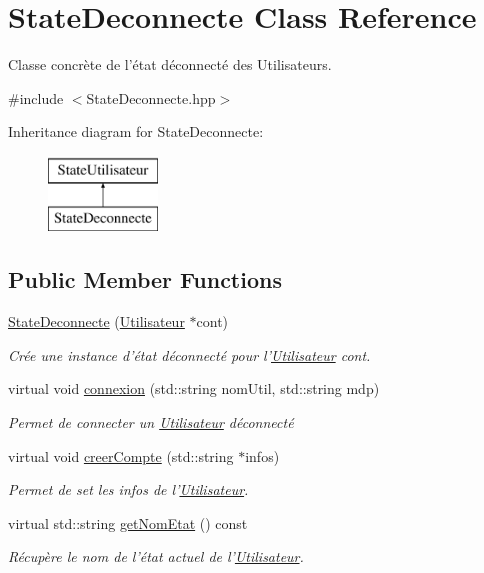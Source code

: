 \hypertarget{classStateDeconnecte}{\section{State\-Deconnecte Class Reference}
\label{classStateDeconnecte}
}


Classe concrète de l'état déconnecté des Utilisateurs.  




{\ttfamily \#include $<$State\-Deconnecte.\-hpp$>$}

Inheritance diagram for State\-Deconnecte\-:\begin{figure}[H]
\begin{center}
\leavevmode
\includegraphics[height=2.000000cm]{classStateDeconnecte}
\end{center}
\end{figure}
\subsection*{Public Member Functions}
\begin{DoxyCompactItemize}
\item 
\hyperlink{classStateDeconnecte_a2f4fe61f40b06f055911b92e6a8a7ee8}{State\-Deconnecte} (\hyperlink{classUtilisateur}{Utilisateur} $\ast$cont)
\begin{DoxyCompactList}\small\item\em Crée une instance d'état déconnecté pour l'\hyperlink{classUtilisateur}{Utilisateur} cont. \end{DoxyCompactList}\item 
virtual void \hyperlink{classStateDeconnecte_af7a2a59f8b4fb3abe585a013cefa360a}{connexion} (std\-::string nom\-Util, std\-::string mdp)
\begin{DoxyCompactList}\small\item\em Permet de connecter un \hyperlink{classUtilisateur}{Utilisateur} déconnecté \end{DoxyCompactList}\item 
virtual void \hyperlink{classStateDeconnecte_a310df467d4d531402ee11b1d8469d1b6}{creer\-Compte} (std\-::string $\ast$infos)
\begin{DoxyCompactList}\small\item\em Permet de set les infos de l'\hyperlink{classUtilisateur}{Utilisateur}. \end{DoxyCompactList}\item 
virtual std\-::string \hyperlink{classStateDeconnecte_ac343c36edc1c66cf4b06b50b8b874654}{get\-Nom\-Etat} () const 
\begin{DoxyCompactList}\small\item\em Récupère le nom de l'état actuel de l'\hyperlink{classUtilisateur}{Utilisateur}. \end{DoxyCompactList}\end{DoxyCompactItemize}
